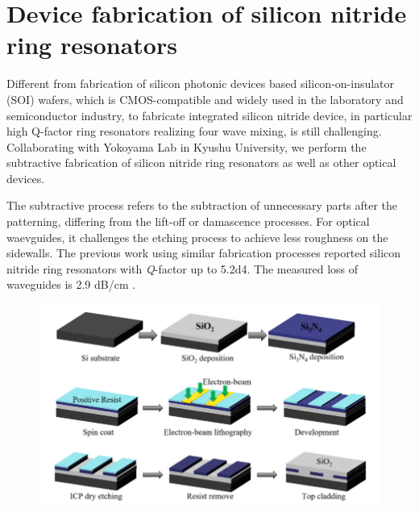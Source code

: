 
\chapter{Device fabrication of silicon nitride ring resonators}

Different from fabrication of silicon photonic devices based silicon-on-insulator (SOI) wafers, which is CMOS-compatible and widely used in the laboratory and semiconductor industry, to fabricate integrated silicon nitride device, in particular high Q-factor ring resonators realizing four wave mixing, is still challenging.
Collaborating with Yokoyama Lab in Kyushu University, we perform the subtractive fabrication of silicon nitride ring resonators as well as other optical devices. 


The subtractive process refers to the subtraction of unnecessary parts after the patterning, differing from the lift-off or damascence processes. For optical waevguides, it challenges the etching process to achieve less roughness on the sidewalls. 
The previous work using similar fabrication processes reported silicon nitride ring resonators with \textit{Q}-factor up to \num{5.2d4}. The measured loss of waveguides is 2.9 dB/cm \cite{Cheng2017b}. 

\begin{figure}
	\centering
	\includegraphics[width=1.0\linewidth]{imgs/png/fab-flow}
	\label{fig:fab-flow}
\end{figure}

